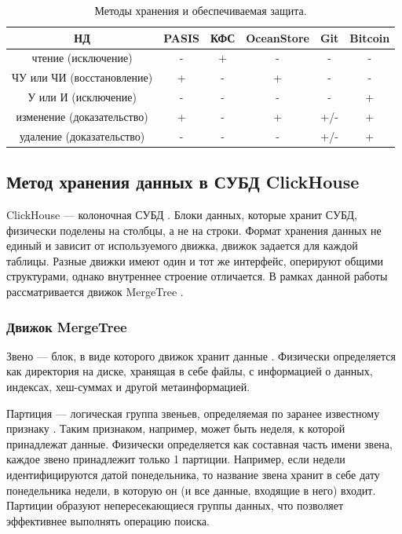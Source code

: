 \begin{table}[h]
    \begin{center}
        \caption{Методы хранения и обеспечиваемая защита.}
        \label{tab:res}
        \begin{tabular}{|c|c|c|c|c|c|}
            \hline
            \bfseries НД & \bfseries PASIS & \bfseries КФС & \bfseries OceanStore & \bfseries Git & \bfseries Bitcoin  \\
            \hline
            чтение (исключение) & - & + & - & - & - \\ \hline
            ЧУ или ЧИ (восстановление) & + & - & + & - & - \\ \hline
            У или И (исключение) & - & - & - & - & + \\ \hline
            изменение (доказательство) & + & - & + & +/- & + \\ \hline
            удаление (доказательство) & - & - & - & +/- & + \\ \hline
        \end{tabular}
    \end{center}
\end{table}

\clearpage

\subsection{Метод хранения данных в СУБД ClickHouse}

ClickHouse --- колоночная СУБД \cite{ch}. Блоки данных, которые хранит СУБД, физически поделены на столбцы, а не на строки. Формат хранения данных не единый и зависит от используемого движка, движок задается для каждой таблицы. Разные движки имеют один и тот же интерфейс, оперируют общими структурами, однако внутреннее строение отличается. В рамках данной работы рассматривается движок MergeTree \cite{mergetree}.

\subsubsection{Движок MergeTree}

Звено --- блок, в виде которого движок хранит данные \cite{mergetreearch}. Физически определяется как директория на диске, хранящая в себе файлы, с информацией о данных, индексах, хеш-суммах и другой метаинформацией.

Партиция --- логическая группа звеньев, определяемая по заранее известному признаку \cite{mergetreearch}. Таким признаком, например, может быть неделя, к которой принадлежат данные. Физически определяется как составная часть имени звена, каждое звено принадлежит только 1 партиции. Например, если недели идентифицируются датой понедельника, то название звена хранит в себе дату понедельника недели, в которую он (и все данные, входящие в него) входит. Партиции образуют непересекающиеся группы данных, что позволяет эффективнее выполнять операцию поиска.


